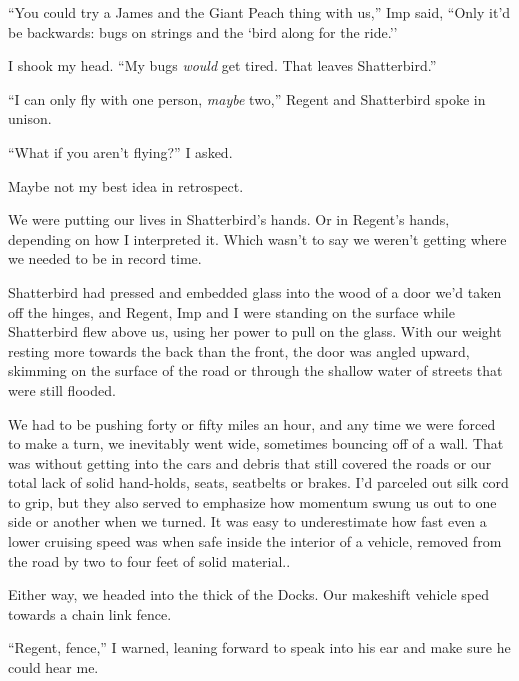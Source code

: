 ``You could try a James and the Giant Peach thing with us,'' Imp said, ``Only it'd be backwards: bugs on strings and the `bird along for the ride.''



I shook my head.  ``My bugs \emph{would} get tired.  That leaves Shatterbird.''



``I can only fly with one person, \emph{maybe} two,'' Regent and Shatterbird spoke in unison.



``What if you aren't flying?''  I asked.



\sectionbreak



Maybe not my best idea in retrospect.



We were putting our lives in Shatterbird's hands.  Or in Regent's hands, depending on how I interpreted it.  Which wasn't to say we weren't getting where we needed to be in record time.



Shatterbird had pressed and embedded glass into the wood of a door we'd taken off the hinges, and Regent, Imp and I were standing on the surface while Shatterbird flew above us, using her power to pull on the glass.  With our weight resting more towards the back than the front, the door was angled upward, skimming on the surface of the road or through the shallow water of streets that were still flooded.



We had to be pushing forty or fifty miles an hour, and any time we were forced to make a turn, we inevitably went wide, sometimes bouncing off of a wall.  That was without getting into the cars and debris that still covered the roads or our total lack of solid hand-holds, seats, seatbelts or brakes.  I'd parceled out silk cord to grip, but they also served to emphasize how momentum swung us out to one side or another when we turned.  It was easy to underestimate how fast even a lower cruising speed was when safe inside the interior of a vehicle, removed from the road by two to four feet of solid material..



Either way, we headed into the thick of the Docks.  Our makeshift vehicle sped towards a chain link fence.



``Regent, fence,'' I warned, leaning forward to speak into his ear and make sure he could hear me.



